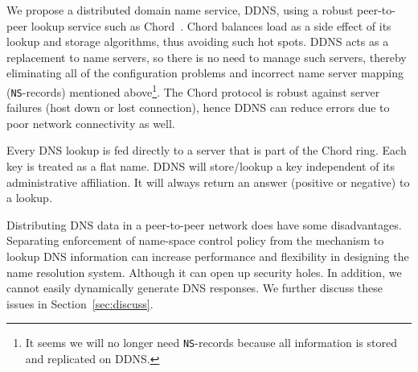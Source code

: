 We propose a distributed domain name service, DDNS,
using a robust peer-to-peer lookup service such as Chord~\cite{chord:sigcomm}.
Chord balances load as a side effect of its lookup and storage 
algorithms, thus avoiding such hot spots.
DDNS acts as a replacement to name servers, so there is no need 
to manage such servers, thereby eliminating all of 
the configuration problems and incorrect name server mapping 
({\tt NS}-records) mentioned above\footnote{It seems we will 
no longer need {\tt NS}-records because all information is 
stored and replicated on DDNS.}.
The Chord protocol is robust against server failures 
(host down or lost connection),
hence DDNS can reduce errors due to poor network connectivity as well.

Every DNS lookup is fed directly to a server that is part of 
the Chord ring. Each key is treated as a flat name. DDNS
will store/lookup a key independent of its administrative 
affiliation. It will always return an answer 
(positive or negative) to a lookup. 
 
Distributing DNS data in a peer-to-peer network does have some
disadvantages. Separating enforcement of name-space control 
policy from the mechanism to lookup DNS information 
can increase performance and flexibility 
in designing the name resolution system. Although it can open up 
security holes. 
In addition, we cannot easily dynamically 
generate DNS responses. We further discuss these issues 
in Section~\ref{sec:discuss}.


